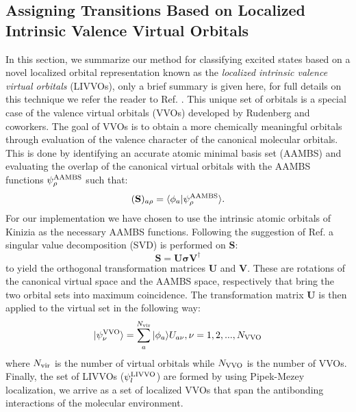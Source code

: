 \documentclass{article}
\begin{document}
\subsection{Assigning Transitions Based on Localized Intrinsic Valence Virtual Orbitals}
In this section, we summarize our method for classifying excited states based on a novel localized orbital representation known as the \textit{localized intrinsic valence virtual orbitals} (LIVVOs), only a brief summary is given here, for full details on this technique we refer the reader to Ref. . This unique set of orbitals is a special case of the valence virtual orbitals (VVOs) developed by Rudenberg and coworkers.\cite{lu_molecule_2004} The goal of VVOs is to obtain a more chemically meaningful orbitals through evaluation of the valence character of the canonical molecular orbitals. This is done by identifying an accurate atomic minimal basis set (AAMBS) and evaluating the overlap of the canonical virtual orbitals with the AAMBS functions $\psi^{\rm AAMBS}_{\rho}$ such that:
\begin{equation}
(\mathbf{S})_{a\rho} = \langle \phi_a | \psi^{\rm AAMBS}_{\rho} \rangle.
\end{equation}
For our implementation we have chosen to use the intrinsic atomic orbitals of Kinizia \cite{knizia_intrinsic_2013} as the necessary AAMBS functions. Following the suggestion of Ref.  a singular value decomposition (SVD) is performed on $\mathbf{S}$:
\begin{equation}
\mathbf{S} = \mathbf{U} \mathbf{\sigma} \mathbf{V}^{\dagger}
\end{equation}
to yield the orthogonal transformation matrices $\mathbf{U}$ and $\mathbf{V}$. These are rotations of the canonical virtual space and the AAMBS space, respectively that bring the two orbital sets into maximum coincidence. The transformation matrix $\mathbf{U}$ is then applied to the virtual set in the following way:
\begin{equation}
|\psi^{\rm VVO}_{\nu} \rangle = \sum_{a}^{N_{\rm vir}} |\phi_a \rangle U_{a\nu}, \nu = 1,2,...,N_{\rm VVO}
\end{equation}
where $N_{\rm vir}$ is the number of virtual orbitals while $N_{\rm VVO}$ is the number of VVOs. Finally, the set of LIVVOs ($\psi^{\rm LIVVO}_l$) are formed by using Pipek-Mezey localization,\cite{pipek_fast_1989} we arrive as a set of localized VVOs that span the antibonding interactions of the molecular environment.
\end{document}
